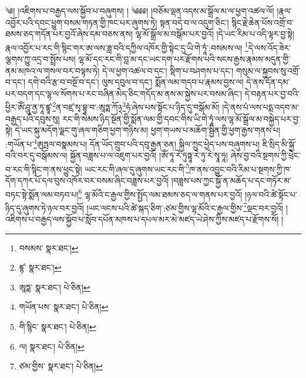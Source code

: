 \setcounter{footnote}{0} 
༄། །འཇིགས་པ་བརྒྱད་ལས་སྐྱོབ་པ་བཞུགས། ། ༄༅༅། །བཅོམ་ལྡན་འདས་མ་སྒྲོལ་མ་ལ་ཕྱག་འཚལ་ལོ། །རྣལ་འབྱོར་པའི་དབང་ཕྱུག་བསམ་གཏན་གྱི་ཁང་པར་ཞུགས་ཏེ། སྟན་བདེ་བ་ལ་འདུག་ཅིང་། སྙིང་རྗེ་ཆེན་པོས་འགྲོ་བ་ཐམས་ཅད་གདོན་པར་བྱའོ་ཞེས་དམ་བཅས་ནས། ལྷ་མོ་སྒྲོལ་མ་བསྒོམ་པར་བྱའོ། །དེ་ཡང་རིམ་པ་འདི་ལྟར་བྱ་སྟེ། རྣལ་འབྱོར་པ་རང་གི་སྙིང་གར་ཨ་ལས་ཟླ་བའི་དཀྱིལ་འཁོར་གྱི་སྟེང་དུ་ཡི་གེ་ཏཱཾ་:བསམས་ལ། \footnote{བསམས་  སྣར་ཐང་། }དེ་ལས་འོད་ཟེར་ལྕགས་ཀྱུ་འདྲ་བ་སྤྲོས་པས། ལྷ་མོ་དང་རང་གི་བླ་མ་དང་ཡང་དག་པར་རྫོགས་པའི་སངས་རྒྱས་རྣམས་མདུན་གྱི་ནམ་མཁའ་ལ་གསལ་བར་བལྟས་ཏེ། དེ་ལ་ཕྱག་འཚལ་བ་དང་། སྡིག་པ་བཤགས་པ་དང་། གསུམ་ལ་སྐྱབས་སུ་འགྲོ་བ་དང་། དགེ་བའི་རྩ་བ་བསྔོ་བ་དང་། ལུས་དབུལ་བ་དང་། སྨོན་ལམ་གདབ་པ་རྣམས་བྱས་ལ། དེ་ནས་དོན་དམ་པར་བདག་དང་ལྷ་ལ་སོགས་པ་རང་བཞིན་མེད་ཅིང་གདོད་མ་ནས་མ་སྐྱེས་པར་བསམ་ཞིང་། དེ་བརྟན་པར་བྱ་བའི་ཕྱིར་ཨོཾ་ཤཱུ་ནྱ་ཏཱ་ཛྙཱ་\footnote{ཛྙ་  སྣར་ཐང་། }ན་བཛྲ་སྭ་བྷཱ་བ་:ཨཱཏྨ་ཀོ྅\footnote{ཨཱཏྨ་  སྣར་ཐང་།  པེ་ཅིན། }ཧཾ་ཞེས་པས་སྟོང་པ་ཉིད་དུ་བསྒོམ་མོ། །དེ་ནས་པཾ་ལས་པདྨ་འདབ་མ་བརྒྱད་པའི་དབུས་སུ། རང་གི་སེམས་ཉིད་སྔོན་གྱི་སྨོན་ལམ་གྱི་དབང་གིས་ཡི་གེ་ཏཱཾ་ལས་ལྷ་མོ་སྒྲོལ་མ་བསྐྱེད་པར་བྱ་སྟེ། དེ་ཡང་སྐུ་མདོག་ལྗང་གུ་ཞལ་གཅིག་ཕྱག་གཉིས་མ། ཕྱག་གཡས་པ་མཆོག་སྦྱིན་གྱི་ཕྱག་རྒྱས་གནས་པ། :གཡོན་པ་\footnote{གཡོན་པས་  སྣར་ཐང་།  པེ་ཅིན། }ཨུཏྤལ་བསྣམས་པ། དོན་ཡོད་གྲུབ་པའི་དབུ་རྒྱན་ཅན། སྐྱིལ་ཀྲུང་ཕྱེད་པས་བཞུགས་པ། ཇི་སྲིད་མི་སྐྱོ་བའི་བར་དུ་བསྒོམས་ལ། སྐྱོན་བཟླས་པ་ལ་འཇུག་པར་བྱའོ། །ཨོཾ་ཏཱ་རེ་ཏུཏྟཱ་རེ་ཏུ་རེ་སྭཱ་ཧཱ། ཞེས་བྱ་བའི་སྔགས་ཀྱི་ཕྲེང་བ་རང་གི་སྙིང་ག་ནས་ཕྱུང་སྟེ། ཡང་རང་གི་ཞལ་དུ་ཞུགས་ཡང་རང་གི་\footnote{གི་སྙིང་  སྣར་ཐང་།  པེ་ཅིན། }ཁ་ནས་འབྱུང་བའི་རིམ་པ་སྔགས་ཀྱི་ཁ་དོག་དཀར་པོ་དལ་བུས་འཁོར་བར་བསམ་ཞིང་བཟླས་པར་བྱའོ། །བཟླས་པས་ཀྱང་སྐྱོ་ན་མཆོད་པ་དང་གཏོར་མ་བཏང་སྟེ་སྨོན་ལམ་བཏབ་པ།\footnote{ལ།  སྣར་ཐང་།  པེ་ཅིན། } ལྷ་མོའི་ང་རྒྱལ་གྱིས་སྤྱོད་ལམ་ཐམས་ཅད་ལ་གནས་པར་བྱའོ། །ཉལ་བའི་ཚེ་སྟོང་པ་ཉིད་དུ་ཞུགས་ཏེ་ཉལ་བར་བྱའོ། །ཡང་ལངས་པའི་ཚེ་སྐད་ཅིག་:ཙམ་གྱིས་ལྷ་མོའི་ང་རྒྱལ་གྱིས་\footnote{ཙམ་གྱིས་  སྣར་ཐང་།  པེ་ཅིན། }ལྡང་བར་བྱའོ། །འཇིགས་པ་བརྒྱད་ལས་སྐྱོབ་པ་སློབ་དཔོན་མཁས་པ་དཔལ་མར་མེ་མཛད་ཡེ་ཤེས་ཀྱིས་མཛད་པ་རྫོགས་སོ། ། 
